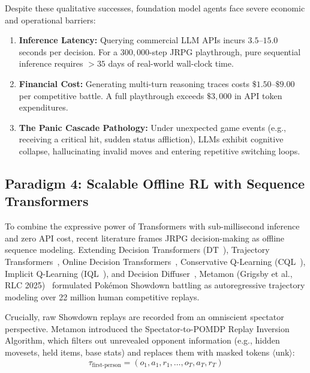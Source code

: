 \documentclass[journal,10pt,twocolumn]{IEEEtran}
\begin{document}
Despite these qualitative successes, foundation model agents face severe economic and operational barriers:
\begin{enumerate}
    \item \textbf{Inference Latency:} Querying commercial LLM APIs incurs $3.5$--$15.0$ seconds per decision. For a $300{,}000$-step JRPG playthrough, pure sequential inference requires $>35$ days of real-world wall-clock time.
    \item \textbf{Financial Cost:} Generating multi-turn reasoning traces costs $\$1.50$--$\$9.00$ per competitive battle. A full playthrough exceeds $\$3{,}000$ in API token expenditures.
    \item \textbf{The Panic Cascade Pathology:} Under unexpected game events (e.g., receiving a critical hit, sudden status affliction), LLMs exhibit cognitive collapse, hallucinating invalid moves and entering repetitive switching loops.
\end{enumerate}

\subsection{Paradigm 4: Scalable Offline RL with Sequence Transformers}
To combine the expressive power of Transformers with sub-millisecond inference and zero API cost, recent literature frames JRPG decision-making as offline sequence modeling. Extending Decision Transformers (DT~\cite{chen2021decisiontransformer}), Trajectory Transformers~\cite{janner2021trajectorytransformer}, Online Decision Transformers~\cite{zheng2022online}, Conservative Q-Learning (CQL~\cite{kumar2020cql}), Implicit Q-Learning (IQL~\cite{kostrikov2022iql}), and Decision Diffuser~\cite{ajay2023decisiondiffuser}, Metamon (Grigsby et al., RLC 2025)~\cite{grigsby2025metamon} formulated Pok{\'e}mon Showdown battling as autoregressive trajectory modeling over 22 million human competitive replays.

Crucially, raw Showdown replays are recorded from an omniscient spectator perspective. Metamon introduced the Spectator-to-POMDP Replay Inversion Algorithm, which filters out unrevealed opponent information (e.g., hidden movesets, held items, base stats) and replaces them with masked tokens $\langle\text{unk}\rangle$:
\begin{equation}
\tau_{\text{first-person}} = \left( o_1, a_1, r_1, \dots, o_T, a_T, r_T \right)
\end{equation}
\end{document}
